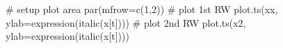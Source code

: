 \begin{Schunk}
\begin{Sinput}
 # setup plot area
 par(mfrow=c(1,2))
 # plot 1st RW
 plot.ts(xx, ylab=expression(italic(x[t])))
 # plot 2nd RW
 plot.ts(x2, ylab=expression(italic(x[t])))
\end{Sinput}
\end{Schunk}
